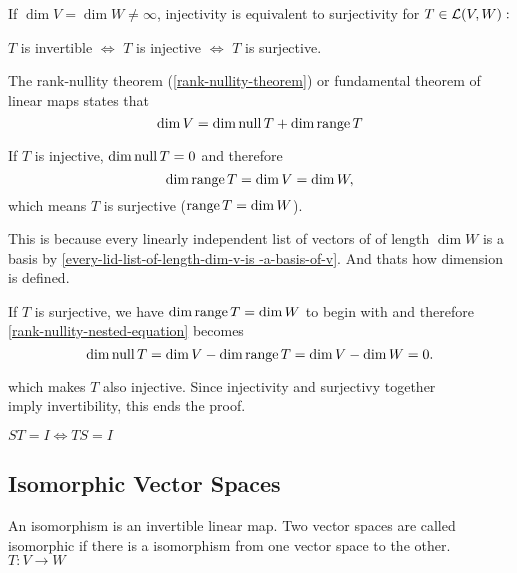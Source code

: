   \setcounter{thm}{64}
  \begin{thm}
    \label{injectivity-is-equivalent-to-surjectivity}
    If $\dim V = \dim W \neq \infty$, injectivity is equivalent to surjectivity for $T\in \mathcal{L}(V,W):$

    $T$ is invertible $\iff$ $T$ is injective $\iff$ $T$ is surjective.
  \end{thm}
  \begin{prf}
    The rank-nullity theorem (\ref{rank-nullity-theorem}) or fundamental theorem of linear maps states that
    \begin{equation}
      \label{rank-nullity-nested-equation}
      \dim V = \dim \operatorname{null} T + \dim \operatorname{range} T
    \end{equation}

    If $T$ is injective, $\dim \operatorname{null} T = 0$ and therefore 
    \begin{equation}
      \dim \operatorname{range} T = \dim V = \dim W,
    \end{equation} 
    which means $T$ is surjective ($\operatorname{range} T = \dim W$). 
    
    This is because every linearly independent list of vectors of of length $\dim W$ is a basis by \ref{every-lid-list-of-length-dim-v-is -a-basis-of-v}. And thats how dimension is defined.

    If $T$ is surjective, we have $\dim \operatorname{range} T = \dim W$ to begin with and therefore \ref{rank-nullity-nested-equation} becomes
    \begin{equation}
      \dim \operatorname{null} T = \dim V - \dim \operatorname{range} T = \dim V - \dim W = 0.
    \end{equation} 
    
    
    which makes $T$ also injective. 
    Since injectivity and surjectivy together \\ imply invertibility, this ends the proof. 
    
    
  \end{prf}



  \setcounter{thm}{67}
  \begin{thm}
    $ST = I \Leftrightarrow TS=I$
  \end{thm}

  \subsection{Isomorphic Vector Spaces}

  \begin{thm}
    An isomorphism is an invertible linear map. Two vector spaces are called isomorphic if there is a isomorphism from one vector space to the other. $T:V\to W$
  \end{thm}

